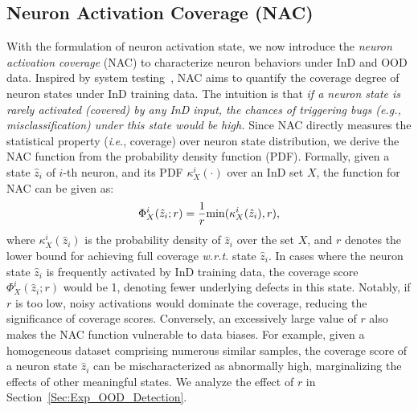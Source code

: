 \documentclass{article} \usepackage{iclr2024_conference,times}
\newcommand{\ie}{\textit{i}.\textit{e}.}
\newcommand{\eg}{\textit{e}.\textit{g}.}
\begin{document}
\subsection{Neuron Activation Coverage (NAC)}
\vspace{-1mm}
\label{Sec:Method_NACFunc}
With the formulation of neuron activation state, we now introduce the \textit{neuron activation coverage} (NAC) to characterize neuron behaviors under InD and OOD data. 
Inspired by system testing~\citep{NACT_System:DeepXplore,NACT_System:DeepGauge,NACT_System:DeepHunter}, NAC aims to quantify the coverage degree of neuron states under InD training data. 
The intuition is that \textit{if a neuron state is rarely activated (covered) by any InD input, the chances of triggering bugs (\eg, misclassification) under this state would be high.}
Since NAC directly measures the statistical property (\ie, coverage) over neuron state distribution, we derive the NAC function from the probability density function (PDF).
Formally, given a state $\hat{z}_i$ of $i$-th neuron, and its PDF $\kappa_X^i(\cdot)$ over an InD set $X$, the function for NAC can be given as:
\vspace{-1mm}
\begin{equation}
	\Phi^i_X(\hat{z}_i;r)= \frac{1}{r}{\rm min}(\kappa_X^i(\hat{z}_i), r),
\vspace{-1mm}
\end{equation}
where $\kappa_X^i(\hat{z}_i)$ is the probability density of $\hat{z}_i$ over the set $X$, and $r$ denotes the lower bound for 
achieving full coverage \textit{w.r.t.} state $\hat{z}_i$. 
In cases where the neuron state $\hat{z}_i$ is frequently activated by InD training data, the coverage score $\Phi^i_X(\hat{z}_i;r)$ would be 1, denoting fewer underlying defects in this state.
Notably, if $r$ is too low, noisy activations would dominate the coverage, reducing the significance of coverage scores. 
Conversely, an excessively large value of $r$ also makes the NAC function vulnerable to data biases. 
For example, given a homogeneous dataset comprising numerous similar samples, the coverage score of a neuron state $\hat{z}_i$ can be mischaracterized as abnormally high, marginalizing the effects of other meaningful states. We analyze the effect of $r$ in Section~\ref{Sec:Exp_OOD_Detection}.
\end{document}

